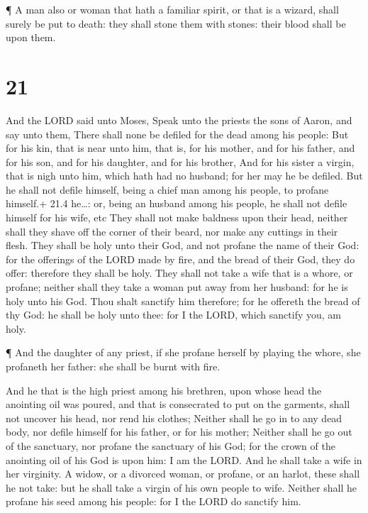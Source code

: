  ¶ A man also or woman that hath a familiar spirit, or that
is a wizard, shall surely be put to death: they shall stone them with
stones: their blood shall be upon them.

\hypertarget{section-20}{%
\section{21}\label{section-20}}

 And the LORD said unto Moses, Speak unto the priests the
sons of Aaron, and say unto them, There shall none be defiled for the
dead among his people:  But for his kin, that is near unto
him, that is, for his mother, and for his father, and for his son, and
for his daughter, and for his brother,  And for his sister a
virgin, that is nigh unto him, which hath had no husband; for her may he
be defiled.  But he shall not defile himself, being a chief
man among his people, to profane himself.+ 21.4 he\ldots: or, being an
husband among his people, he shall not defile himself for his wife, etc
 They shall not make baldness upon their head, neither shall
they shave off the corner of their beard, nor make any cuttings in their
flesh.  They shall be holy unto their God, and not profane
the name of their God: for the offerings of the LORD made by fire, and
the bread of their God, they do offer: therefore they shall be holy.
 They shall not take a wife that is a whore, or profane;
neither shall they take a woman put away from her husband: for he is
holy unto his God.  Thou shalt sanctify him therefore; for
he offereth the bread of thy God: he shall be holy unto thee: for I the
LORD, which sanctify you, am holy.

 ¶ And the daughter of any priest, if she profane herself by
playing the whore, she profaneth her father: she shall be burnt with
fire.

 And he that is the high priest among his brethren, upon
whose head the anointing oil was poured, and that is consecrated to put
on the garments, shall not uncover his head, nor rend his clothes;
 Neither shall he go in to any dead body, nor defile
himself for his father, or for his mother;  Neither shall
he go out of the sanctuary, nor profane the sanctuary of his God; for
the crown of the anointing oil of his God is upon him: I am the LORD.
 And he shall take a wife in her virginity.  A
widow, or a divorced woman, or profane, or an harlot, these shall he not
take: but he shall take a virgin of his own people to wife.
 Neither shall he profane his seed among his people: for I
the LORD do sanctify him.

